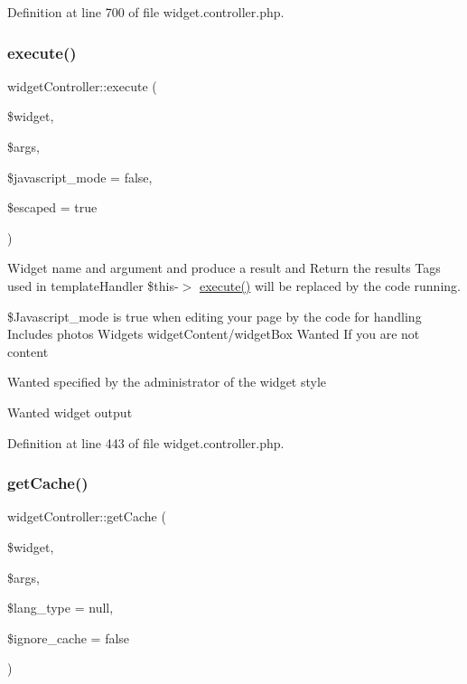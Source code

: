 Definition at line 700 of file widget.\+controller.\+php.

\mbox{\label{classwidgetController_a8344d21b83ae400500e70f371817a8d9}} 
\subsubsection{\texorpdfstring{execute()}{execute()}}
{\footnotesize\ttfamily widget\+Controller\+::execute (\begin{DoxyParamCaption}\item[{}]{\$widget,  }\item[{}]{\$args,  }\item[{}]{\$javascript\+\_\+mode = {\ttfamily false},  }\item[{}]{\$escaped = {\ttfamily true} }\end{DoxyParamCaption})}



Widget name and argument and produce a result and Return the results Tags used in template\+Handler \$this-\/$>$ \hyperlink{classwidgetController_a8344d21b83ae400500e70f371817a8d9}{execute()} will be replaced by the code running. 

\$\+Javascript\+\_\+mode is true when editing your page by the code for handling Includes photos Widgets widget\+Content/widget\+Box Wanted If you are not content

Wanted specified by the administrator of the widget style

Wanted widget output

Definition at line 443 of file widget.\+controller.\+php.

\mbox{\label{classwidgetController_ad866136705c196f9b7b231f58be317eb}} 
\subsubsection{\texorpdfstring{get\+Cache()}{getCache()}}
{\footnotesize\ttfamily widget\+Controller\+::get\+Cache (\begin{DoxyParamCaption}\item[{}]{\$widget,  }\item[{}]{\$args,  }\item[{}]{\$lang\+\_\+type = {\ttfamily null},  }\item[{}]{\$ignore\+\_\+cache = {\ttfamily false} }\end{DoxyParamCaption})}



